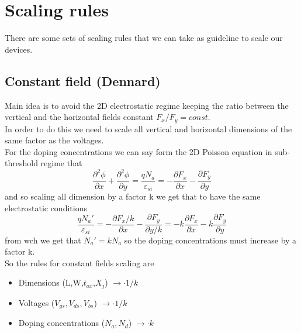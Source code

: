 \section{Scaling rules}
There are some sets of scaling rules that we can take as guideline to scale our devices.

\subsection{Constant field (Dennard)}
Main idea is to avoid the 2D electrostatic regime keeping the ratio between the vertical and the horizontal fields constant $F_x/F_y=const.$\\
In order to do this we need to scale all vertical and horizontal dimensions of the same factor as the voltages.\\ 
For the doping concentrations we can say form the 2D Poisson equation in sub-threshold regime that 
\begin{equation}
\frac{\partial^2 \phi}{\partial x}+\frac{\partial^2 \phi}{\partial y}=\frac{qN_a}{\varepsilon_{si}}=-\frac{\partial F_x}{\partial x}-\frac{\partial F_y}{\partial y}
\end{equation}
and so scaling all dimension by a factor k we get that to have the same electrostatic conditions
\begin{equation}
\frac{qN_a'}{\varepsilon_{si}}=-\frac{\partial F_x/k}{\partial x}-\frac{\partial F_y}{\partial y/k}=-k\frac{\partial F_x}{\partial x}-k\frac{\partial F_y}{\partial y}
\end{equation}
from wch we get that $N_a'=kN_a$ so the doping concentrations must increase by a factor k.\\
So the rules for constant fields scaling are 
\begin{itemize}
  \item Dimensions (L,W,$t_{ox}$,$X_j$)     $\rightarrow \cdot 1/k$
  \item Voltages ($V_{gs},V_{ds},V_{bs}$)   $\rightarrow \cdot 1/k$
  \item Doping concentrations ($N_a,N_d$)   $\rightarrow \cdot k$
\end{itemize}

